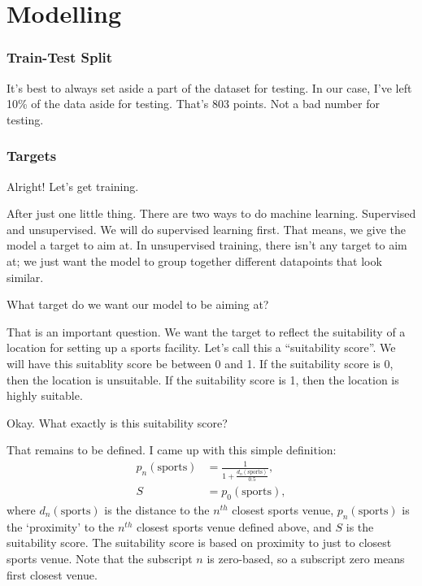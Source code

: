 \chapter{Modelling}

\subsection{Train-Test Split}
It's best to always set aside a part of the dataset for testing. In our case, I've left 10\% of the data aside for testing. That's 803 points. Not a bad number for testing. 


\subsection{Targets}
{\color{blue} Alright! Let's get training.}

After just one little thing. There are two ways to do machine learning. Supervised and unsupervised. We will do supervised learning first. That means, we give the model a target to aim at. In unsupervised training, there isn't any target to aim at; we just want the model to group together different datapoints that look similar. 

{\color{blue} What target do we want our model to be aiming at?}

That is an important question. We want the target to reflect the suitability of a location for setting up a sports facility. Let's call this a ``suitability score''. We will have this suitablity score be between 0 and 1. If the suitability score is 0, then the location is unsuitable. If the suitability score is 1, then the location is highly suitable. 

{\color{blue} Okay. What exactly is this suitability score?}

That remains to be defined. I came up with this simple definition:
\begin{equation}
	\begin{aligned}
		p_n(\text{sports}) &= \frac{1}{1+\frac{d_n(\text{sports})}{0.5}}, \\
		S &= p_0(\text{sports}),
	\end{aligned}
\end{equation}
where $d_n(\text{sports})$ is the distance to the $n^{th}$ closest sports venue, $p_n(\text{sports})$ is the `proximity' to the $n^{th}$ closest sports venue defined above, and $S$ is the suitability score. The suitability score is based on proximity to just to closest sports venue. Note that the subscript $n$ is zero-based, so a subscript zero means first closest venue. 


